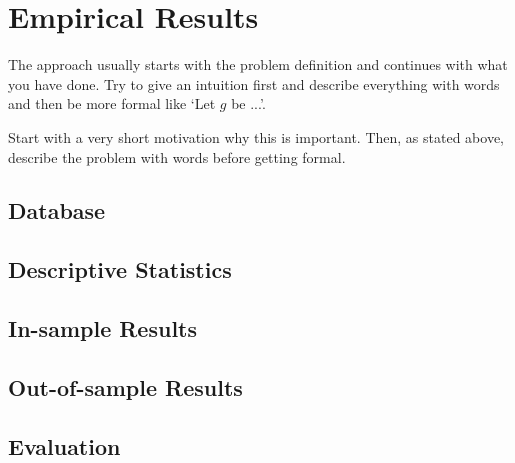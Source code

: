\chapter{Empirical Results}\label{chap:mainresults}
The approach usually starts with the problem definition and continues with what you have done. Try to give an intuition first and describe everything with words and then be more formal like `Let $g$ be ...'.

Start with a very short motivation why this is important. Then, as stated above, describe the problem with words before getting formal.
\section{Database}







\section{Descriptive Statistics}

\section{In-sample Results}

\section{Out-of-sample Results}

\section{Evaluation}